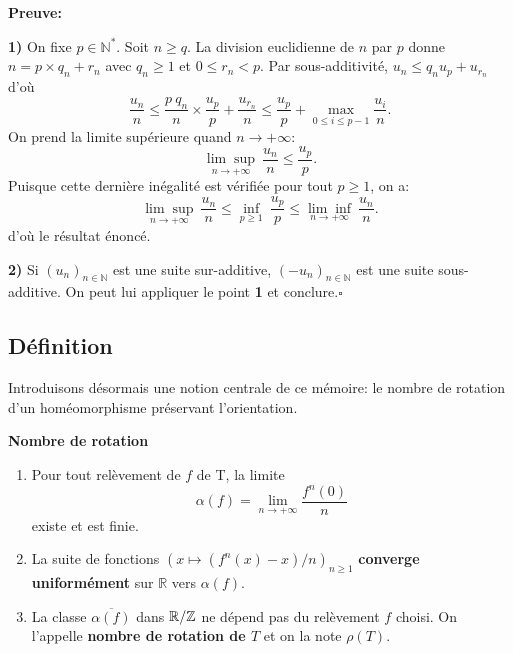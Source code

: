 \textbf{Preuve:}
	\par\textbf{1)} On fixe $p \in \mathbb{N}^*$. Soit $n \geq q$. La division euclidienne de $n$ par $p$ donne\\ $n=p \times q_n+r_n$ avec $q_n \geq 1$ et $0 \leq r_n < p$. Par sous-additivité, $u_n \leq q_n u_p + u_{r_n}$ d'où
	$$\frac{u_n}{n} \leq \frac{p \ q_n}{n} \times \frac{u_p}{p} + \frac{u_{r_n}}{n} \leq \frac{u_p}{p} + \underset{0 \leq i \leq p-1}{\max}\frac{u_i}{n}.$$
	On prend la limite supérieure quand $n \longrightarrow + \infty$:
	$$\underset{n \longrightarrow + \infty}{\lim \sup}\ \frac{u_n}{n}\leq \frac{u_p}{p}.$$
	Puisque cette dernière inégalité est vérifiée pour tout $p \geq 1$, on a:
	$$\underset{n \longrightarrow + \infty}{\lim \sup}\ \frac{u_n}{n} \leq \underset{p \geq 1}{\inf}\ \frac{u_p}{p} \leq \underset{n \longrightarrow + \infty}{\lim \inf}\ \frac{u_n}{n}.$$
	d'où le résultat énoncé.\\
	\par \textbf{2)} Si $(u_n)_{n \in \mathbb{N}}$ est une suite sur-additive, $(-u_n)_{n \in \mathbb{N}}$ est une suite sous-additive. On peut lui appliquer le point \textbf{1} et conclure.\hfill $\square$\\











\subsection{Définition}
Introduisons désormais une notion centrale de ce mémoire: le nombre de rotation d'un homéomorphisme préservant l'orientation.
\begin{thmdefi}\label{nombre de rotation}
	\textbf{Nombre de rotation}
\begin{enumerate}
	\item Pour tout relèvement de $f$ de T, la limite $$\alpha(f) = \underset{n \to + \infty}{\lim} \frac{f^n(0)}{n}$$ existe et est finie.

	\item La suite de fonctions $(x \mapsto (f^n(x)-x)/n)_{n\geq 1} $ \textbf{converge uniformément} sur $\mathbb{R}$ vers $\alpha(f)$.

	\item  La classe $\overline{\alpha(f)}$ dans ${\mathbb{R}}/\mathbb{Z}$ ne dépend pas du relèvement $f$ choisi. On l'appelle \textbf{nombre de rotation de $T$} et on la note $\rho(T)$.
\end{enumerate}
\end{thmdefi}


